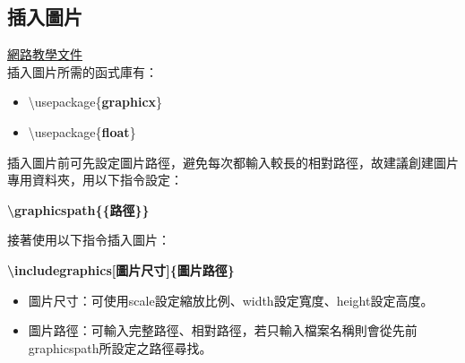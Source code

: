 \documentclass[12pt]{article}
\begin{document}
\begin{CJK*}{UTF8}{bsmi}
			\subsection{插入圖片}
				\href{https://www.overleaf.com/learn/latex/Inserting_Images}{網路教學文件} \\
				插入圖片所需的函式庫有： \\
				\begin{itemize}
					\item \textbackslash usepackage\{\textbf{graphicx}\}
					\item \textbackslash usepackage\{\textbf{float}\}
				\end{itemize}
				插入圖片前可先設定圖片路徑，避免每次都輸入較長的相對路徑，故建議創建圖片專用資料夾，用以下指令設定：
				\begin{center}
					\textbf{\textbackslash graphicspath\{\{路徑\}\}}
				\end{center}
				接著使用以下指令插入圖片：
				\begin{center}
					\textbf{\textbackslash includegraphics[圖片尺寸]\{圖片路徑\}}
				\end{center}
				\begin{itemize}
					\item 圖片尺寸：可使用scale設定縮放比例、width設定寬度、height設定高度。
					\item 圖片路徑：可輸入完整路徑、相對路徑，若只輸入檔案名稱則會從先前graphicspath所設定之路徑尋找。
				\end{itemize}
				

\end{CJK*}
\end{document}
